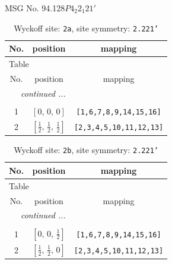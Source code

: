 \documentclass[fleqn,8pt]{jsarticle}
\begin{document}
\setcounter{MaxMatrixCols}{32}

\renewcommand{\tablename}{Table~}
\renewcommand{\figurename}{Figure~}
\begin{center}
\LARGE
MSG No. 94.128\quad$P4_{2}2_{1}21'$
\end{center}
\renewcommand{\arraystretch}{1.2}
\begin{longtable}{ccc}
\caption{Wyckoff site: {\tt 2a}, site symmetry: {\tt 2.221'}}
 \\
 \hline \hline
No. & position & mapping \\ \hline \endfirsthead

\multicolumn{2}{l}{\tablename\ \thetable{}} \\
 \hline \hline
No. & position & mapping \\ \hline \endhead

 \hline \hline
\multicolumn{2}{r}{\footnotesize\it continued ...} \\ \endfoot

 \hline \hline
\multicolumn{2}{r}{} \\ \endlastfoot

1 & $\left[ 0,\, 0,\, 0 \right]$ & {\tt [1,6,7,8,9,14,15,16]} \\ \hline
2 & $\left[ \frac{1}{2},\, \frac{1}{2},\, \frac{1}{2} \right]$ & {\tt [2,3,4,5,10,11,12,13]} \\
\end{longtable}
\renewcommand{\arraystretch}{1.2}
\begin{longtable}{ccc}
\caption{Wyckoff site: {\tt 2b}, site symmetry: {\tt 2.221'}}
 \\
 \hline \hline
No. & position & mapping \\ \hline \endfirsthead

\multicolumn{2}{l}{\tablename\ \thetable{}} \\
 \hline \hline
No. & position & mapping \\ \hline \endhead

 \hline \hline
\multicolumn{2}{r}{\footnotesize\it continued ...} \\ \endfoot

 \hline \hline
\multicolumn{2}{r}{} \\ \endlastfoot

1 & $\left[ 0,\, 0,\, \frac{1}{2} \right]$ & {\tt [1,6,7,8,9,14,15,16]} \\ \hline
2 & $\left[ \frac{1}{2},\, \frac{1}{2},\, 0 \right]$ & {\tt [2,3,4,5,10,11,12,13]} \\
\end{longtable}
\end{document}
